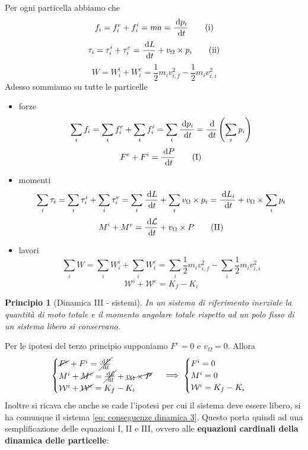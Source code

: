 \documentclass{article}
\newtheorem*{principio}{Principio}
\theoremstyle{plain}
\begin{document}
Per ogni particella abbiamo che 
\[f_i = f_i^e + f_i^i = ma = \frac{\:\text{d} p_i}{\:\text{d} t}\tag{i}\]
\[\tau_i =\tau_i^i + \tau_i^e =\frac{\:\text{d} L}{\:\text{d} t} + v_\Omega \times p_i\tag{ii}\]
\[W = W^i_i + W^e_i = \frac{1}{2}m_iv_{i,f}^2 - \frac{1}{2}m_iv_{i,i}^2\tag{iii}\]
Adesso sommiamo su tutte le particelle
\begin{itemize}
    \item forze
    \[\sum_if_i = \sum_if_i^e + \sum_if_i^i = \sum_i \frac{\:\text{d} p_i}{\:\text{d} t} =\frac{\:\text{d} }{\:\text{d} t}\left(\sum_ip_i\right)\]
    \[F^e + F^i =\frac{\:\text{d} P}{\:\text{d} t} \tag{I}\]
    \item momenti
    \[\sum_i\tau_i =\sum_i\tau_i^i + \sum_i\tau_i^e =\sum_i\frac{\:\text{d} L}{\:\text{d} t} + \sum_iv_\Omega \times p_i = \frac{\:\text{d} L_i}{\:\text{d} t} + v_\Omega \times \sum_ip_i \]
    \[M^i + M^e =\frac{\:\text{d} \mathcal{L}}{\:\text{d} t} + v_{\Omega} \times P \tag{II}\]
    \item lavori
    \[\sum_iW = \sum_iW^i_i + \sum_iW^e_i = \sum_i\frac{1}{2}m_iv_{i,f}^2 - \sum_i\frac{1}{2}m_iv_{i,i}^2\]
    \[\mathcal{W}^i +\mathcal{W}^e = K_f - K_i\tag{III}\]
\end{itemize}
\begin{shaded}
\begin{principio}[Dinamica III - sistemi]
    In un sistema di riferimento inerziale la quantità di moto totale e il momento angolare totale rispetto ad un polo fisso di un sistema libero si conservano.
\end{principio}
\end{shaded}
Per le ipotesi del terzo principio supponiamo $F^e=0$ e $v_\Omega=0$. Allora
\begin{equation}\begin{cases} 
    \cancel{F^e} + F^i =\cancel{\frac{\:\text{d} P}{\:\text{d} t}}\\
    M^i + \cancel{M^e} = \cancel{\frac{\:\text{d} \mathcal{L}}{\:\text{d} t}} + \cancel{v_{\Omega} \times P}\\
    \mathcal{W}^i + \cancel{\mathcal{W}^e} = K_f - K_i\
\end{cases} \implies
\begin{cases} 
    F^i = 0\\
    M^i = 0\\
    \mathcal{W}^i= K_f - K_i\
\end{cases} 
\label{eq: conseguenze dinamica 3}
\end{equation}
Inoltre si ricava che anche se cade l'ipotesi per cui il sistema deve essere libero, si ha comunque il sistema \eqref{eq: conseguenze dinamica 3}. Questo porta quindi ad una semplificazione delle equazioni I, II e III, ovvero alle \textbf{equazioni cardinali della dinamica delle particelle}:
\end{document}
